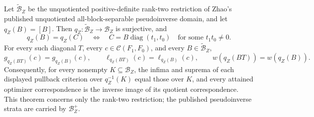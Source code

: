 Let \(\widetilde{\mathcal B}_Z\) be the unquotiented positive-definite rank-two restriction of Zhao's published unquotiented all-block-separable pseudoinverse domain, and let \(q_Z(B)=[B]\).  Then \(q_Z:\widetilde{\mathcal B}_Z\to\mathcal B_Z\) is surjective, and
\[
q_Z(B)=q_Z(C)
\quad\Longleftrightarrow\quad
C=B\operatorname{diag}(t_1,t_0)
\quad\text{for some }t_1t_0\ne0.
\]
For every such diagonal \(T\), every \(c\in\mathcal C(F_1,F_0)\), and every \(B\in\widetilde{\mathcal B}_Z\),
\[
g_{q_Z(BT)}(c)=g_{q_Z(B)}(c),\qquad
\ell_{q_Z(BT)}(c)=\ell_{q_Z(B)}(c),\qquad
w(q_Z(BT))=w(q_Z(B)).
\]
Consequently, for every nonempty \(K\subseteq\mathcal B_Z\), the infima and suprema of each displayed pullback criterion over \(q_Z^{-1}(K)\) equal those over \(K\), and every attained optimizer correspondence is the inverse image of its quotient correspondence.  This theorem concerns only the rank-two restriction; the published pseudoinverse strata are carried by \(\mathcal B_Z^+\).